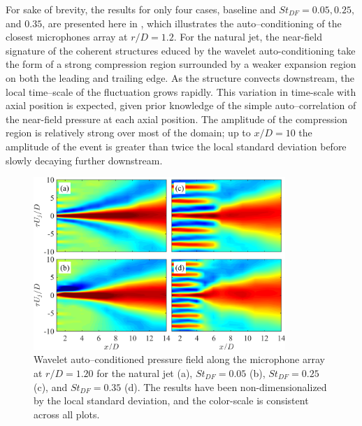 For sake of brevity, the results for only four cases, baseline and $St_{DF} = 0.05, 0.25,$ and $0.35$, are presented here in , which illustrates the auto--conditioning of the closest microphones array at $r/D = 1.2$.
For the natural jet, the near-field signature of the coherent structures educed by the wavelet auto-conditioning take the form of a strong compression region surrounded by a weaker expansion region on both the leading and trailing edge. 
As the structure convects downstream, the local time--scale of the fluctuation grows rapidly.
This variation in time-scale with axial position is expected, given prior knowledge of the simple auto--correlation of the near-field pressure at each axial position.
The amplitude of the compression region is relatively strong over most of the domain; up to $x/D=10$ the amplitude of the event is greater than twice the local standard deviation before slowly decaying further downstream. 
\begin{figure}
	\centering
	\includegraphics[width=0.85\textwidth]{Figures/wavelet_conditioning.png}
	\caption{Wavelet auto--conditioned pressure field along the microphone array at $r/D = 1.20$ for the natural jet (a), $St_{DF} = 0.05$ (b), $St_{DF} = 0.25$ (c), and $St_{DF} = 0.35$ (d). The results have been non-dimensionalized by the local standard deviation, and the color-scale is consistent across all plots.}
	\label{fig:WaveAutoCond}
\end{figure}

